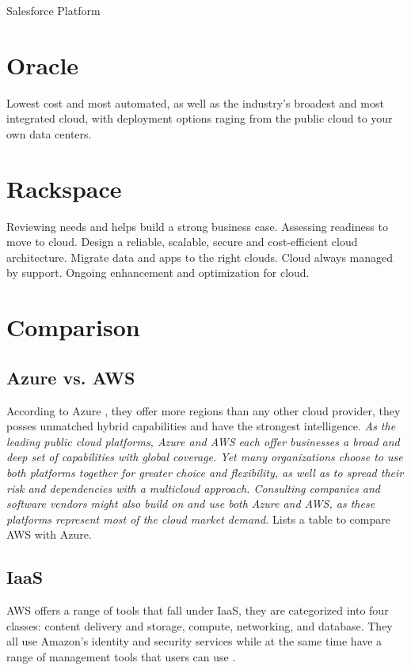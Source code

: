 Salesforce Platform 

\section{Oracle}
Lowest cost and most automated, as well as the industry's broadest and most integrated cloud, with deployment options raging from the public cloud to your own data centers. 

\section{Rackspace}
Reviewing needs and helps build a strong business case. Assessing readiness to move to cloud. Design a reliable, scalable, secure and cost-efficient cloud architecture. Migrate data and apps to the right clouds. Cloud always managed by support. Ongoing enhancement and optimization for cloud. 

\section{Comparison}

\subsection{Azure vs. AWS}
According to Azure \cite{Azure}, they offer more regions than any other cloud provider, they posses unmatched hybrid capabilities and have the strongest intelligence. 
\textit{As the leading public cloud platforms, Azure and AWS each offer businesses a broad and deep set of capabilities with global coverage. Yet many organizations choose to use both platforms together for greater choice and flexibility, as well as to spread their risk and dependencies with a multicloud approach. Consulting companies and software vendors might also build on and use both Azure and AWS, as these platforms represent most of the cloud market demand.} Lists a table to compare AWS with Azure.

\subsection{IaaS}
AWS offers a range of tools that fall under IaaS, they are categorized into four classes: content delivery and storage, compute, networking, and database. They all use Amazon's identity and security services while at the same time have a range of management tools that users can use \cite{stackify}. 


